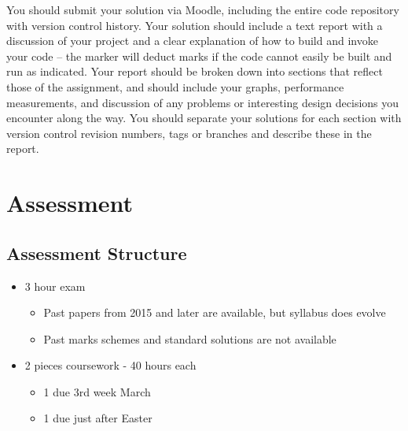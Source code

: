 You should submit your solution via Moodle, including the entire code
repository with version control history. Your solution should include a
text report with a discussion of your project and a clear explanation of
how to build and invoke your code -- the marker will deduct marks if the
code cannot easily be built and run as indicated. Your report should be
broken down into sections that reflect those of the assignment, and
should include your graphs, performance measurements, and discussion of
any problems or interesting design decisions you encounter along the
way. You should separate your solutions for each section with version
control revision numbers, tags or branches and describe these in the
report.

\section{Assessment}\label{assessment}

\subsection{Assessment Structure}\label{assessment-structure}

\begin{itemize}
\itemsep1pt\parskip0pt
\item
  3 hour exam

  \begin{itemize}
  \itemsep1pt\parskip0pt
  \item
    Past papers from 2015 and later are available, but syllabus does
    evolve
  \item
    Past marks schemes and standard solutions are not available
  \end{itemize}
\item
  2 pieces coursework - 40 hours each

  \begin{itemize}
  \itemsep1pt\parskip0pt
  \item
    1 due 3rd week March
  \item
    1 due just after Easter
  \end{itemize}
\end{itemize}
